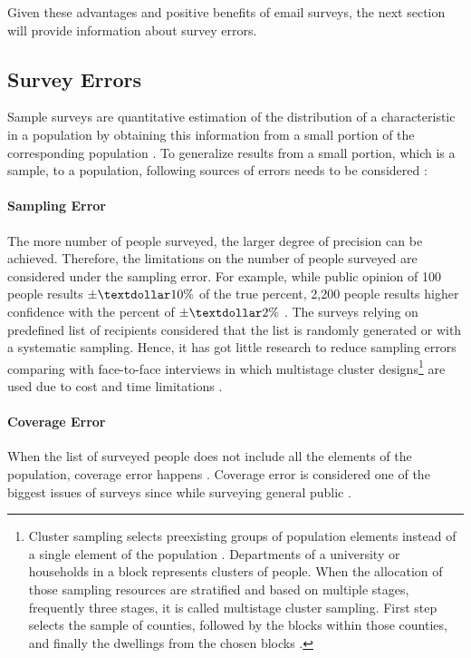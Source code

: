 Given these advantages and positive benefits of email surveys, the next section will provide information about survey errors.

\subsection{Survey Errors}
\label{sec:2.1.2:SurErr}
Sample surveys are quantitative estimation of the distribution of a characteristic in a population by obtaining this information from a small portion of the corresponding population \citep{Dillman1991}. To generalize results from a small portion, which is a sample, to a population, following sources of errors needs to be considered \citetext{\citealp[page 9]{Dillman2006}; \citealp{Dillman1991}}:

\paragraph{Sampling Error}
The more number of people surveyed, the larger degree of precision can be achieved. Therefore, the limitations on the number of people surveyed are considered under the sampling error. For example, while public opinion of 100 people results \(\pm\textdollar10\%\) of the true percent, 2,200 people results higher confidence with the percent of \(\pm\textdollar2\%\) \citep[page 9]{Dillman2006}. The surveys relying on predefined list of recipients considered that the list is randomly generated or with a systematic sampling. Hence, it has got little research to reduce sampling errors comparing with face-to-face interviews in which multistage cluster designs\footnote{Cluster sampling selects preexisting groups of population elements instead of a single element of the population \citep[page 106]{Groves2009}. Departments of a university or households in a block represents clusters of people. When the allocation of those sampling resources are stratified and based on multiple stages, frequently three stages, it is called multistage cluster sampling. First step selects the sample of counties, followed by the blocks within those counties, and finally the dwellings from the chosen blocks \citep{Scott1969}.} are used due to cost and time limitations \citetext{\citealp[page 106]{Groves2009}; \citealp{Dillman1991}}.

\paragraph{Coverage Error}
When the list of surveyed people does not include all the elements of the population, coverage error happens \citep[page 9]{Dillman2006}. Coverage error is considered one of the biggest issues of surveys since while surveying general public \citep{Dillman1991}.

